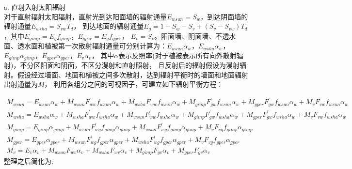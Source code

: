 a. 直射入射太阳辐射\\
对于直射辐射太阳辐射，直射光到达阳面墙的辐射通量$E_{wsun}=S_w$，到达阴面墙的辐射通量$E_{wsha}=S_{vw}T_d$，
到达地面的辐射通量$E_g=1-S_w-S_v+\left(S_v-S_{vw}\right)T_d$，其中$E_{gimp}=E_gf_{gimp}$，$E_{gper}=E_gf_{gper}$，
$E_v=S_v$。阳面墙、阴面墙、不透水面、透水面和植被第一次散射辐射通量可分别计算为：$E_{wsun}\alpha_w$，$E_{wsha}\alpha_w$，
$E_{gimp}\alpha_{gimp}$，$E_{gper}\alpha_{gper}$，$E_v\alpha_v$，
其中$\alpha$表示反照率(对于植被表示所有向外散射辐射)，不分区阳面和阴面，不区分漫射和直射照射，
且反射后的辐射假设为漫射辐射。假设经过墙面、地面和植被之间多次散射，达到辐射平衡时的墙面和地面辐射出射通量为$M$，
利用各组分之间的可视因子，可建立如下辐射平衡方程：
\begin{landscape}
\begin{equation}
\begin{array}{l}M_{wsun}=E_{wsun} \alpha_{w}+M_{wsun} F_{ww}^{\prime} f_{wsun} \alpha_{w}+M_{wsha} F_{ww}^{\prime} f_{wsun} \alpha_{w}+M_{gimp} F_{g w}^{\prime} f_{wsun} \alpha_{w}+M_{gper} F_{g w}^{\prime} f_{wsun} \alpha_{w}+M_{v} F_{v w} f_{wsun} \alpha_{w} \\ M_{wsha}=E_{wsha} \alpha_{w}+M_{wsha} F_{ww}^{\prime} f_{wsha} \alpha_{w}+M_{wsun} F_{ww}^{\prime} f_{wsha} \alpha_{w}+M_{gimp} F_{g w}^{\prime} f_{wsha} \alpha_{w}+M_{gper} F_{g w}^{\prime} f_{wsha} \alpha_{w}+M_{v} F_{v w} f_{wsha} \alpha_{w} \\ M_{gimp}=E_{gimp} \alpha_{gimp}+M_{wsun} F_{w g}^{\prime} f_{gimp} \alpha_{gimp}+M_{wsha} F_{w g}^{\prime} f_{gimp} \alpha_{gimp}+M_{v} F_{v g} f_{gimp} \alpha_{gimp} \\ M_{gper}=E_{gper} \alpha_{gper}+M_{wsun} F_{w g}^{\prime} f_{gper} \alpha_{gper}+M_{wsha} F_{w g}^{\prime} f_{gper} \alpha_{gper}+M_{v} F_{v g} f_{gper} \alpha_{gper} \\ M_{v}=E_{v} \alpha_{v}+M_{wsun} F_{w v} \alpha_{v}+M_{wsha} F_{w v} \alpha_{v}+M_{gimp} F_{g v} \alpha_{v}+M_{gper} F_{g v} \alpha_{v}\end{array}
\end{equation}
整理之后简化为:
\begin{equation}

\end{equation}
\end{landscape}
